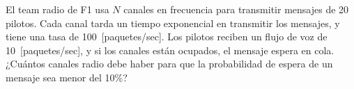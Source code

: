 \documentclass{upmassignment}
\begin{document}
\begin{problemlist}
    \begin{solucion}
        

    \end{solucion}

\newpage
    \pbitem El team radio de F1
    usa $N$ canales en frecuencia para
    transmitir mensajes de 20 pilotos.
    Cada canal tarda un tiempo exponencial
    en transmitir los mensajes, y tiene
    una tasa de 100~[paquetes/sec].
    Los pilotos reciben un flujo de voz de
    10~[paquetes/sec], y si los canales 
    están ocupados, el mensaje espera en cola.
    ¿Cuántos canales radio debe haber para
    que la probabilidad de espera de un
    mensaje sea menor del 10\%?

    \begin{minipage}{\textwidth}
        \centering
        \resizebox{!}{.27\textwidth}{%
            
        }
    \end{minipage}

    \begin{solucion}
       

    \end{solucion}
\end{problemlist}
\end{document}
